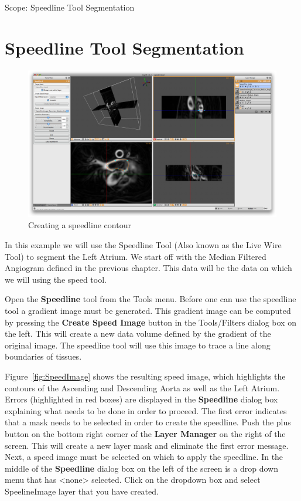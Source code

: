 \documentclass[fleqn,11pt,openany]{book}
\begin{document}
\begin{introduction}
Scope: Speedline Tool Segmentation
\end{introduction}

\section{Speedline Tool Segmentation}

\begin{figure}
\includegraphics[width=\textwidth]{Seg3DTutorial_figures/Speedline.png}
\caption{Creating a speedline contour}\label{fig:SpeedLine1}
\end{figure}

In this example we will use the Speedline Tool (Also known as the Live Wire Tool) to segment the Left Atrium. We start off with the Median Filtered Angiogram defined in the previous chapter. This data will be the data on which we will using the speed tool.

Open  the {\bf Speedline} tool from the Tools menu. Before one can use the speedline tool a gradient image must be generated. This gradient image can be computed by pressing the {\bf Create Speed Image} button in the Tools/Filters dialog box on the left. This will create a new data volume defined by the gradient of the original image. The speedline tool will use this image to trace a line along boundaries of tissues.

Figure~\ref{fig:SpeedImage} shows the resulting speed image, which highlights the contours of the Ascending and Descending Aorta as well as the Left Atrium. Errors (highlighted in red boxes) are displayed in the {\bf Speedline} dialog box explaining what needs to be done in order to proceed.  The first error indicates that a mask needs to be selected in order to create the speedline.  Push the plus button on the bottom right corner of the {\bf Layer Manager} on the right of the screen.  This will create a new layer mask and eliminate the first error message.  Next, a speed image must be selected on which to apply the speedline.  In the middle of the {\bf Speedline} dialog box on the left of the screen is a drop down menu that has <none> selected.  Click on the dropdown box and select SpeelineImage layer that you have created.
\end{document}
